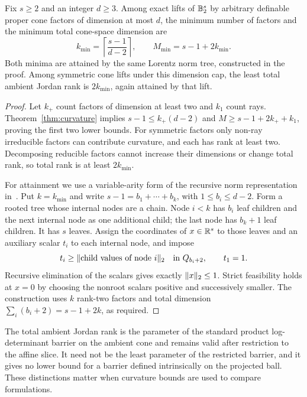 \begin{corollary}\label{cor:dimension-resources}
Fix $s\geq2$ and an integer $d\geq3$. Among exact lifts of $\mathbb B_2^s$ by
arbitrary definable proper cone factors of dimension at most $d$, the
minimum number of factors and the minimum total cone-space dimension are
\[
 k_{\min}=\left\lceil\frac{s-1}{d-2}\right\rceil,
 \qquad M_{\min}=s-1+2k_{\min}.
\]
Both minima are attained by the same Lorentz norm tree, constructed in
the proof. Among
symmetric cone lifts under this dimension cap, the least total ambient
Jordan rank is $2k_{\min}$, again attained by that lift.
\end{corollary}
\begin{proof}
Let $k_+$ count factors of dimension at least two and $k_1$ count rays.
Theorem~\ref{thm:curvature} implies
$s-1\leq k_+(d-2)$ and
$M\geq s-1+2k_++k_1$, proving the first two lower bounds.
For symmetric factors only non-ray irreducible factors can contribute
curvature, and each has rank at least two. Decomposing reducible factors
cannot increase their dimensions or change total rank, so total rank is
at least $2k_{\min}$.

For attainment we use a variable-arity form of the recursive norm
representation in~\cite[Section~2, equation~(5)]{BTN2001}.
Put $k=k_{\min}$ and write $s-1=b_1+\cdots+b_k$, with
$1\leq b_i\leq d-2$. Form a rooted tree whose internal nodes are a chain.
Node $i<k$ has $b_i$ leaf children and the next internal node as one
additional child; the last node has $b_k+1$ leaf children. It has $s$
leaves. Assign the coordinates of $x\in\mathbb R^s$ to those leaves and an
auxiliary scalar $t_i$ to each internal node, and impose
\[
 t_i\geq\lVert \text{child values of node }i\rVert_2
 \quad\text{in }Q_{b_i+2},\qquad t_1=1.
\]
Recursive elimination of the scalars gives exactly
$\lVert x\rVert_2\leq1$. Strict feasibility
holds at $x=0$ by choosing the nonroot scalars positive and successively
smaller. The construction uses $k$ rank-two factors and total dimension
$\sum_i(b_i+2)=s-1+2k$, as required.
\end{proof}

The total ambient Jordan rank is the parameter of the standard product
log-determinant barrier on the ambient cone and remains valid after
restriction to the affine slice. It need not be the least parameter of
the restricted barrier, and it gives no lower bound for a barrier defined
intrinsically on the projected ball. These distinctions matter when
curvature bounds are used to compare formulations.
